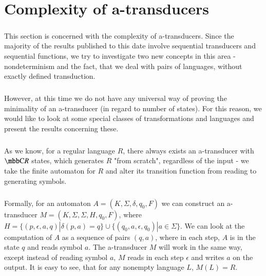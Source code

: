 \chapter{Complexity of a-transducers}
\label{chap:complexity}

\paragraph{}
This section is concerned with the complexity of a-transducers. Since the majority of the results published to this date involve sequential transducers and sequential functions, we try to investigate two new concepts in this area - nondeterminism and the fact, that we deal with pairs of languages, without exactly defined transduction.

\paragraph{}
However, at this time we do not have any universal way of proving the minimality of an a-transducer (in regard to number of states). For this reason, we would like to look at some special classes of transformations and languages and present the results concerning these.

\paragraph{}
As we know, for a regular language $R$, there always exists an a-transducer with $\C{R}$ states, which generates $R$ "from scratch", regardless of the input - we take the finite automaton for $R$ and alter its transition function from reading to generating symbols.

\paragraph{}
Formally, for an automaton $A = (K, \Sigma, \delta, q_0, F)$ we can construct an a-transducer $M = (K, \Sigma, \Sigma, H, q_0, F)$, where $H = \{ (p, \epsilon, a, q) | \delta (p, a) = q\} \cup \{ (q_0, a, \epsilon, q_0) | a \in \Sigma \} $. We can look at the computation of $A$ as a sequence of pairs $(q, a)$, where in each step, $A$ is in the state $q$ and reads symbol $a$. The a-transducer $M$ will work in the same way, except instead of reading symbol $a$, $M$ reads in each step $\epsilon$ and writes $a$ on the output. It is easy to see, that for any nonempty language $L$, $M(L) = R$.


